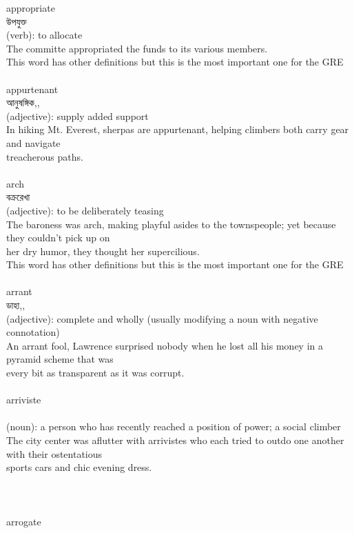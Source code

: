 \documentclass{article}
\begin{document}
{appropriate}\\
{উপযুক্ত}\\
{(verb): to allocate\\The committe appropriated the funds to its various members.\\This word has other definitions but this is the most important one for the GRE\\}\\
{appurtenant}\\
{আনুষঙ্গিক,,}\\
{(adjective): supply added support\\In hiking Mt. Everest, sherpas are appurtenant, helping climbers both carry gear and navigate\\treacherous paths.\\}\\
{arch}\\
{বক্ররেখা}\\
{(adjective): to be deliberately teasing\\The baroness was arch, making playful asides to the townspeople; yet because they couldn't pick up on\\her dry humor, they thought her supercilious.\\This word has other definitions but this is the most important one for the GRE\\}\\
{arrant}\\
{ডাহা,,}\\
{(adjective): complete and wholly (usually modifying a noun with negative connotation)\\An arrant fool, Lawrence surprised nobody when he lost all his money in a pyramid scheme that was\\every bit as transparent as it was corrupt.\\}\\
{arriviste}\\
{}\\
{(noun): a person who has recently reached a position of power; a social climber\\The city center was aflutter with arrivistes who each tried to outdo one another with their ostentatious\\sports cars and chic evening dress.\\\\                                                                                \\}\\
{arrogate}\\
\end{document}
